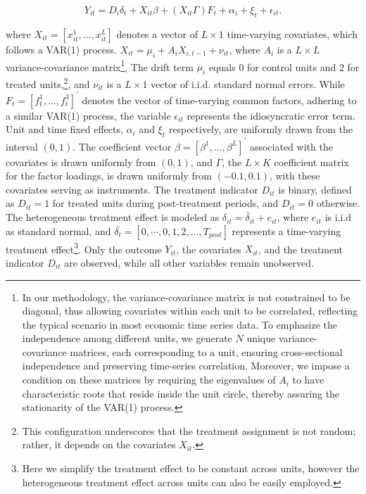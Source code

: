 \documentclass[12pt]{article}
\begin{document}
\begin{equation}
Y_{it} = D_{i} \delta_{t} + X_{it}\beta + (X_{it}\Gamma) F_{t} + \alpha_i + \xi_t + \epsilon_{it}.
\tag{6}
\label{eq: dgp}
\end{equation}

\noindent where $X_{it} = [x_{it}^1, \ldots, x_{it}^{L}]$ denotes a vector of $L \times 1$ time-varying covariates, which follows a VAR(1) process. $X_{it} = \mu_i + A_i X_{i,t-1} + \nu_{it}$, where $A_i$ is a $ L \times L$ variance-covariance matrix\footnote{In our methodology, the variance-covariance matrix is not constrained to be diagonal, thus allowing covariates within each unit to be correlated, reflecting the typical scenario in most economic time series data. To emphasize the independence among different units, we generate $N$ unique variance-covariance matrices, each corresponding to a unit, ensuring cross-sectional independence and preserving time-series correlation. Moreover, we impose a condition on these matrices by requiring the eigenvalues of $A_i$ to have characteristic roots that reside inside the unit circle, thereby assuring the stationarity of the VAR(1) process.}, The drift term $\mu_i$ equals 0 for control units and 2 for treated units,\footnote{This configuration underscores that the treatment assignment is not random; rather, it depends on the covariates $X_{it}$.}, and $\nu_{it}$ is a $L \times 1$ vector of i.i.d. standard normal errors. While $F_t = [f_t^1, \ldots, f_t^3]^\prime$ denotes the vector of time-varying common factors, adhering to a similar VAR(1) process, the variable $\epsilon_{it}$ represents the idiosyncratic error term. Unit and time fixed effects, $\alpha_i$ and $\xi_{t}$ respectively, are uniformly drawn from the interval $(0,1)$. The coefficient vector $\beta = [\beta^1, \ldots, \beta^{L}]^\prime$ associated with the covariates is drawn uniformly from $(0,1)$, and $\Gamma$, the $L \times K$ coefficient matrix for the factor loadings, is drawn uniformly from $(-0.1, 0.1)$, with these covariates serving as instruments. The treatment indicator $D_{it}$ is binary, defined as $D_{it} = 1$ for treated units during post-treatment periods, and $D_{it} = 0$ otherwise. The heterogeneous treatment effect is modeled as $\delta_{it} = \bar{\delta}_{it} + e_{it}$, where $e_{it}$ is i.i.d as standard normal, and $\bar{\delta_t} = [0, \cdots, 0, 1,2,\ldots,T_{post}]$ represents a time-varying treatment effect\footnote{Here we simplify the treatment effect to be constant across units, however the heterogeneous treatment effect across units can also be easily employed.}. Only the outcome $Y_{it}$, the covariates $X_{it}$, and the treatment indicator $D_{it}$ are observed, while all other variables remain unobserved.
\end{document}
